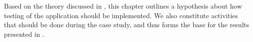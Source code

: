 Based on the theory discussed in , this chapter
outlines a hypothesis about how testing of the application should be
implemented. We also constitute activities that should be done during
the case study, and thus forms the base for the results presented in
.
